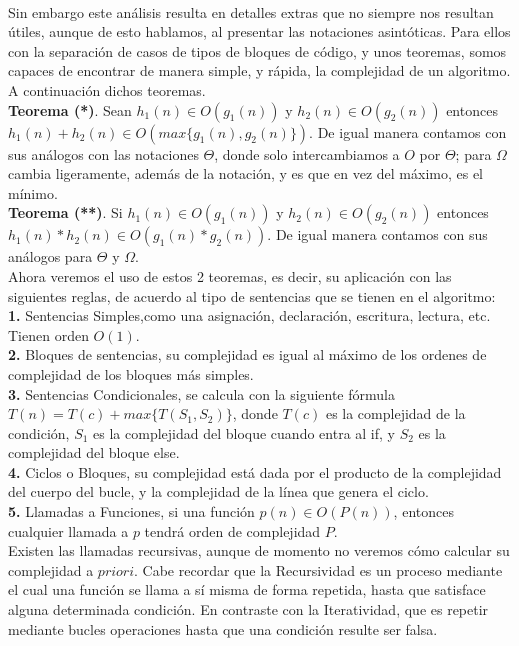 \documentclass[12pt,twoside]{article}
\begin{document}
\\ Sin embargo este análisis resulta en detalles extras que no siempre nos resultan útiles, aunque de esto hablamos, al presentar las notaciones asintóticas. Para ellos con la separación de casos de tipos de bloques de código, y unos teoremas, somos capaces de encontrar de manera simple, y rápida, la complejidad de un algoritmo. A continuación dichos teoremas.
\\ \textbf{Teorema (*)}. Sean $h_1(n)\in O(g_1(n))$ y $h_2(n)\in O(g_2(n))$ entonces $h_1(n)+h_2(n)\in O(max\{g_1(n),g_2(n)\})$. De igual manera contamos con sus análogos con las notaciones $\Theta$, donde solo intercambiamos a $O$ por $\Theta$; para $\Omega$ cambia ligeramente, además de la notación, y es que en vez del máximo, es el mínimo.
\\ \textbf{Teorema (**)}. Si $h_1(n)\in O(g_1(n))$ y $h_2(n)\in O(g_2(n))$ entonces $h_1(n)*h_2(n)\in O(g_1(n)*g_2(n))$. De igual manera contamos con sus análogos para $\Theta$ y $\Omega$.
\\ Ahora veremos el uso de estos 2 teoremas, es decir, su aplicación con las siguientes reglas, de acuerdo al tipo de sentencias que se tienen en el algoritmo:
\\ \textbf{1.} Sentencias Simples,como una asignación, declaración, escritura, lectura, etc. Tienen orden $O(1)$.
\\ \textbf{2.} Bloques de sentencias, su complejidad es igual al máximo de los ordenes de complejidad de los bloques más simples.
\\ \textbf{3.} Sentencias Condicionales, se calcula con la siguiente fórmula $T(n) = T(c)+ max\{T(S_1,S_2)\}$, donde $T(c)$ es la complejidad de la condición, $S_1$ es la complejidad del bloque cuando entra al if, y $S_2$ es la complejidad del bloque else.
\\ \textbf{4.} Ciclos o Bloques, su complejidad está dada por el producto de la complejidad del cuerpo del bucle, y la complejidad de la línea que genera el ciclo. 
\\ \textbf{5.} Llamadas a Funciones, si una función $p(n) \in O(P(n))$, entonces cualquier llamada a $p$ tendrá orden de complejidad $P$.
\\ Existen las llamadas recursivas, aunque de momento no veremos cómo calcular su complejidad a $priori$.
Cabe recordar que la Recursividad es un proceso mediante el cual una función se llama a sí misma de forma repetida, hasta que satisface alguna determinada condición. En contraste con la Iteratividad, que es repetir mediante bucles operaciones hasta que una condición resulte ser falsa.
\end{document}
